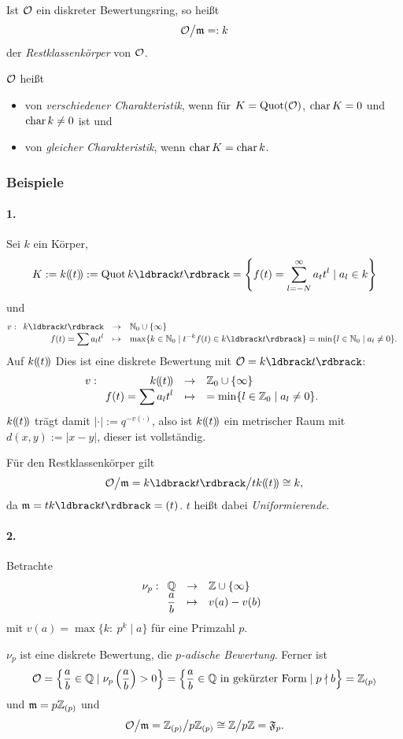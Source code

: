 \begin{definition}
	Ist $\mathcal{O}$ ein diskreter Bewertungsring, so heißt 
	\[ \mathcal{O}\big/ \mathfrak{m} =: k\]
	der \emph{Restklassenkörper} von $\mathcal{O}$.
	
	$\mathcal{O}$ heißt 
  \begin{itemize}
    \item von \emph{verschiedener Charakteristik}, wenn
      für $K = \operatorname{Quot}(\mathcal{O})$, $\operatorname{char} K = 0$ und $\operatorname{char} k \neq 0$ ist und
    \item von \emph{gleicher Charakteristik}, wenn $\operatorname{char} K = \operatorname{char} k$.
  \end{itemize}
\end{definition}

\subsubsection{Beispiele}

\paragraph{1.} Sei $k$ ein Körper, 
\[K := k \dr t := \Quot k \dk t = \left\{f(t) = \sum_{l=-N}^\infty a_t t^l \mid 
	a_l \in k \right\}\]
und
\[
	v: \funcdef{ k\dk t &\to& \N_0 \cup\{\infty\} \\
		f(t) = \sum a_l t^l  & \mapsto & 
			\max\{ k\in \N_0 \mid t^{-k} f(t) \in k\dk t\}
			= \min\{ l\in \N_0 \mid a_l \neq 0 \}.}
\]
Auf $k(\!( t )\!)$ Dies ist eine diskrete Bewertung mit $\O = k\dk t$:
\[
	v: \funcdef{ k\dr t &\to& \Z_0 \cup\{\infty\} \\
		f(t) = \sum a_l t^l  & \mapsto & 
			= \min\{ l\in \Z_0 \mid a_l \neq 0 \}.}
\]
$k(\!( t )\!)$ trägt damit $|\cdot | := q^{-v(\cdot)}$, also ist $k(\!( t )\!)$ ein
metrischer Raum mit $d(x,y) := |x-y|$, dieser ist vollständig.

Für den Restklassenkörper gilt
\[ \O \big/ \m = k\dk t \big/ t k \dr t \cong k, \]
da $\m = t k\dk t = (t)$. $t$ heißt dabei \emph{Uniformierende}.


\paragraph{2.}
Betrachte
\[ \nu_p: \funcdef{ \Q & \to & \Z \cup \{\infty\}\\
	\frac a b & \mapsto & v(a) - v(b)}
\]
mit $v(a) = \max\{ k:\ p^k \mid a \}$ für eine Primzahl $p$. 

$\nu_p$ ist eine diskrete Bewertung, die \emph{$p$-adische Bewertung}.
Ferner ist
\[
	\mathcal{O} = \left\{ \frac a b \in \mathbb{Q} \mid \nu_p\left(\frac a b\right) > 0
		\right\}
		=
		\left\{ \frac a b \in \mathbb{Q} \text{ in gekürzter Form} \mid 
			p\nmid b \right\}
		= \mathbb{Z}_{(p)}
\]
und $\mathfrak{m} = p \mathbb{Z}_{(p)}$ und 
\[
	\mathcal{O}\big/ \mathfrak{m} = \mathbb{Z}_{(p)} \big/ p\mathbb{Z}_{(p)} \cong
		\mathbb{Z} \big/ p\mathbb{Z} = \mathfrak F_p.
\]

